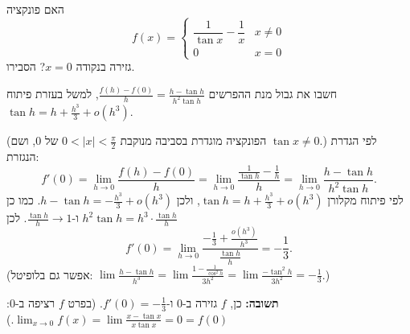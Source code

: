 
\begin{question}
האם פונקציה
\[ f(x)=\begin{cases}\dfrac{1}{\tan x}-\dfrac1x & x\neq0\\[2mm] 0 & x=0\end{cases} \]
גזירה בנקודה $x=0$? הסבירו.
\end{question}

\begin{hint}
חשבו את גבול מנת ההפרשים $\frac{f(h)-f(0)}{h}=\frac{h-\tan h}{h^2\tan h}$, למשל בעזרת פיתוח $\tan h=h+\frac{h^3}{3}+o(h^3)$.
\end{hint}

\begin{solution}
(הפונקציה מוגדרת בסביבה מנוקבת $0<|x|<\frac\pi2$ של $0$, ושם $\tan x\ne0$.) לפי הגדרת הנגזרת:
\[ f'(0)=\lim_{h\to0}\frac{f(h)-f(0)}{h}=\lim_{h\to0}\frac{\frac1{\tan h}-\frac1h}{h}=\lim_{h\to0}\frac{h-\tan h}{h^2\tan h}. \]
לפי פיתוח מקלורן $\tan h=h+\frac{h^3}{3}+o(h^3)$, ולכן $h-\tan h=-\frac{h^3}{3}+o(h^3)$. כמו כן $h^2\tan h=h^3\cdot\frac{\tan h}{h}$ ו-$\frac{\tan h}{h}\to1$. לכן
\[ f'(0)=\lim_{h\to0}\frac{-\frac13+\frac{o(h^3)}{h^3}}{\frac{\tan h}{h}}=-\frac13. \]
(אפשר גם בלופיטל: $\lim\frac{h-\tan h}{h^3}=\lim\frac{1-\frac1{\cos^2h}}{3h^2}=\lim\frac{-\tan^2h}{3h^2}=-\frac13$.)

\textbf{תשובה:} כן, $f$ גזירה ב-$0$ ו-$f'(0)=-\frac13$. (בפרט $f$ רציפה ב-$0$: $\lim_{x\to0}f(x)=\lim\frac{x-\tan x}{x\tan x}=0=f(0)$.)
\end{solution}
